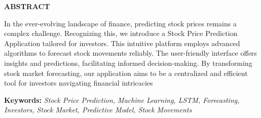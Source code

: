 \documentclass[./main.tex]{subfiles}
\begin{document}
\newpage
\begin{center}
    \textbf{\fontsize{16}{20}\selectfont ABSTRACT}
\end{center}
\noindent
In the ever-evolving landscape of finance, predicting stock prices remains a complex challenge. Recognizing this, we introduce a Stock Price Prediction Application tailored for investors. This intuitive platform employs advanced algorithms to forecast stock movements reliably. The user-friendly interface offers insights and predictions, facilitating informed decision-making. By transforming stock market forecasting, our application aims to be a centralized and efficient tool for investors navigating financial intricacies

\textbf{Keywords:} \textit{Stock Price Prediction, Machine Learning, LSTM,  Forecasting, Investors, Stock Market, Predictive Model, Stock Movements }
\end{document}
